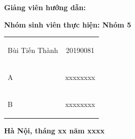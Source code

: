 \begin{titlepage}
\begin{minipage}{0.8\textwidth}
\vspace{1cm}
\textbf{Giảng viên hướng dẫn: }

\vspace{1cm}
\textbf{Nhóm sinh viên thực hiện: Nhóm 5 }
\vspace{0.5cm}
\begin{center}
\begin{tabular}{p{}c}
\begin{bfseries}Bùi Tiến Thành\end{bfseries}&  \begin{bfseries}20190081\end{bfseries}\\
\begin{bfseries}A\end{bfseries}& \begin{bfseries}xxxxxxxx\end{bfseries}\\
\begin{bfseries}B\end{bfseries}& \begin{bfseries}xxxxxxxx\end{bfseries}\\
\end{tabular}
\end{center}
\vspace{2.5cm}
\begin{center}
    \textbf{Hà Nội, tháng xx năm xxxx}
\end{center}
\end{minipage}
\end{titlepage}

